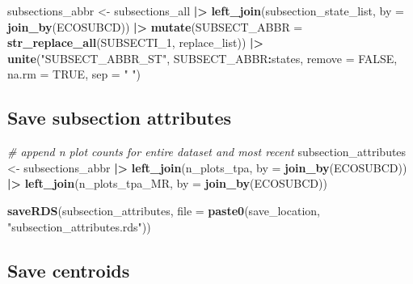 \documentclass[
]{book}
\newenvironment{Shaded}{\begin{snugshade}}{\end{snugshade}}
\newcommand{\AttributeTok}[1]{\textcolor[rgb]{0.13,0.29,0.53}{#1}}
\newcommand{\CommentTok}[1]{\textcolor[rgb]{0.56,0.35,0.01}{\textit{#1}}}
\newcommand{\ConstantTok}[1]{\textcolor[rgb]{0.56,0.35,0.01}{#1}}
\newcommand{\FunctionTok}[1]{\textcolor[rgb]{0.13,0.29,0.53}{\textbf{#1}}}
\newcommand{\NormalTok}[1]{#1}
\newcommand{\OtherTok}[1]{\textcolor[rgb]{0.56,0.35,0.01}{#1}}
\newcommand{\SpecialCharTok}[1]{\textcolor[rgb]{0.81,0.36,0.00}{\textbf{#1}}}
\newcommand{\StringTok}[1]{\textcolor[rgb]{0.31,0.60,0.02}{#1}}
\begin{document}
\begin{Shaded}
\begin{Highlighting}[]
\NormalTok{subsections\_abbr }\OtherTok{\textless{}{-}}\NormalTok{ subsections\_all }\SpecialCharTok{|\textgreater{}}
  \FunctionTok{left\_join}\NormalTok{(subsection\_state\_list, }\AttributeTok{by =} \FunctionTok{join\_by}\NormalTok{(ECOSUBCD)) }\SpecialCharTok{|\textgreater{}}
  \FunctionTok{mutate}\NormalTok{(}\AttributeTok{SUBSECT\_ABBR =} \FunctionTok{str\_replace\_all}\NormalTok{(SUBSECTI\_1, replace\_list)) }\SpecialCharTok{|\textgreater{}}
  \FunctionTok{unite}\NormalTok{(}\StringTok{"SUBSECT\_ABBR\_ST"}\NormalTok{, SUBSECT\_ABBR}\SpecialCharTok{:}\NormalTok{states, }\AttributeTok{remove =} \ConstantTok{FALSE}\NormalTok{, }\AttributeTok{na.rm =} \ConstantTok{TRUE}\NormalTok{, }\AttributeTok{sep =} \StringTok{" "}\NormalTok{) }
\end{Highlighting}
\end{Shaded}

\hypertarget{save-subsection-attributes}{%
\subsection{Save subsection attributes}\label{save-subsection-attributes}}

\begin{Shaded}
\begin{Highlighting}[]
\CommentTok{\# append n plot counts for entire dataset and most recent}
\NormalTok{subsection\_attributes }\OtherTok{\textless{}{-}}\NormalTok{ subsections\_abbr }\SpecialCharTok{|\textgreater{}}
  \FunctionTok{left\_join}\NormalTok{(n\_plots\_tpa, }\AttributeTok{by =} \FunctionTok{join\_by}\NormalTok{(ECOSUBCD)) }\SpecialCharTok{|\textgreater{}}
  \FunctionTok{left\_join}\NormalTok{(n\_plots\_tpa\_MR, }\AttributeTok{by =} \FunctionTok{join\_by}\NormalTok{(ECOSUBCD))}

\FunctionTok{saveRDS}\NormalTok{(subsection\_attributes, }\AttributeTok{file =} \FunctionTok{paste0}\NormalTok{(save\_location, }\StringTok{"subsection\_attributes.rds"}\NormalTok{))}
\end{Highlighting}
\end{Shaded}

\hypertarget{save-centroids}{%
\subsection{Save centroids}\label{save-centroids}}
\end{document}
